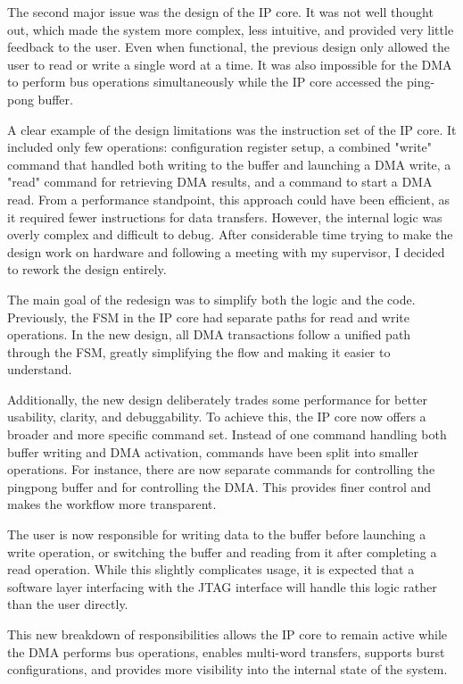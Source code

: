 \documentclass[a4paper,11pt,oneside]{report}
\begin{document}
The second major issue was the design of the IP core.  
It was not well thought out, which made the system more complex, less intuitive, and provided very little feedback to the user.  
Even when functional, the previous design only allowed the user to read or write a single word at a time.  
It was also impossible for the DMA to perform bus operations simultaneously while the IP core accessed the ping-pong buffer.

A clear example of the design limitations was the instruction set of the IP core.  
It included only few operations: configuration register setup, a combined "write" command that handled both writing to the buffer and launching a DMA write,  
a "read" command for retrieving DMA results, and a command to start a DMA read.  
From a performance standpoint, this approach could have been efficient, as it required fewer instructions for data transfers.  
However, the internal logic was overly complex and difficult to debug.  
After considerable time trying to make the design work on hardware and following a meeting with my supervisor, I decided to rework the design entirely.

The main goal of the redesign was to simplify both the logic and the code.  
Previously, the FSM in the IP core had separate paths for read and write operations.  
In the new design, all DMA transactions follow a unified path through the FSM, greatly simplifying the flow and making it easier to understand.

Additionally, the new design deliberately trades some performance for better usability, clarity, and debuggability.  
To achieve this, the IP core now offers a broader and more specific command set.  
Instead of one command handling both buffer writing and DMA activation, commands have been split into smaller operations.  
For instance, there are now separate commands for controlling the pingpong buffer and for controlling the DMA.  
This provides finer control and makes the workflow more transparent.

The user is now responsible for writing data to the buffer before launching a write operation,  
or switching the buffer and reading from it after completing a read operation.  
While this slightly complicates usage, it is expected that a software layer interfacing with the JTAG interface will handle this logic rather than the user directly.

This new breakdown of responsibilities allows the IP core to remain active while the DMA performs bus operations,  
enables multi-word transfers, supports burst configurations, and provides more visibility into the internal state of the system.
\end{document}

